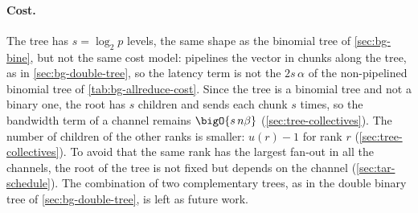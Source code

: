 \paragraph{Cost.}
The tree has $s=\log_2p$ levels, the same shape as the binomial tree of \cref{sec:bg-bine}, but not the same cost model: \nccl{} pipelines the vector in chunks along the tree, as in \cref{sec:bg-double-tree}, so the latency term is not the $2s\,\alpha$ of the non-pipelined binomial tree of \cref{tab:bg-allreduce-cost}.
Since the \bine{} tree is a binomial tree and not a binary one, the root has $s$ children and sends each chunk $s$ times, so the bandwidth term of a channel remains $\bigO{s\,n\beta}$ (\cref{sec:tree-collectives}).
The number of children of the other ranks is smaller: $u(r)-1$ for rank $r$ (\cref{sec:tree-collectives}).
To avoid that the same rank has the largest fan-out in all the channels, the root of the tree is not fixed but depends on the channel (\cref{sec:tar-schedule}).
The combination of two complementary \bine{} trees, as in the double binary tree of \cref{sec:bg-double-tree}, is left as future work.
